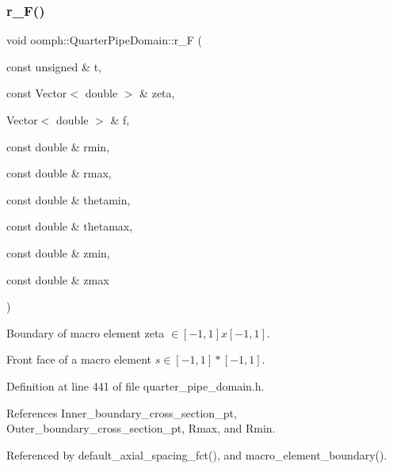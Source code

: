 \subsubsection{\texorpdfstring{r\+\_\+\+F()}{r\_F()}}
{\footnotesize\ttfamily void oomph\+::\+Quarter\+Pipe\+Domain\+::r\+\_\+F (\begin{DoxyParamCaption}\item[{const unsigned \&}]{t,  }\item[{const Vector$<$ double $>$ \&}]{zeta,  }\item[{Vector$<$ double $>$ \&}]{f,  }\item[{const double \&}]{rmin,  }\item[{const double \&}]{rmax,  }\item[{const double \&}]{thetamin,  }\item[{const double \&}]{thetamax,  }\item[{const double \&}]{zmin,  }\item[{const double \&}]{zmax }\end{DoxyParamCaption})\hspace{0.3cm}{\ttfamily [private]}}



Boundary of macro element zeta $ \in [-1,1]x[-1,1] $. 

Front face of a macro element $ s \in [-1,1]*[-1,1] $. 

Definition at line 441 of file quarter\+\_\+pipe\+\_\+domain.\+h.



References Inner\+\_\+boundary\+\_\+cross\+\_\+section\+\_\+pt, Outer\+\_\+boundary\+\_\+cross\+\_\+section\+\_\+pt, Rmax, and Rmin.



Referenced by default\+\_\+axial\+\_\+spacing\+\_\+fct(), and macro\+\_\+element\+\_\+boundary().

\mbox{\label{classoomph_1_1QuarterPipeDomain_a21c58b76f546300c308d6e1f303a3433}} 
